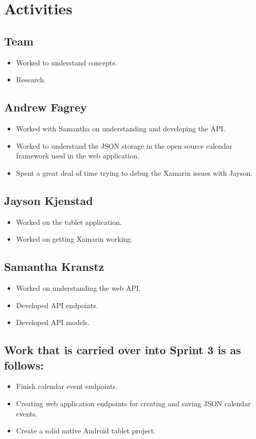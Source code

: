 \documentclass{article}
\begin{document}
{\section*{Activities}
\subsection*{Team}
\begin{itemize}
\item Worked to understand concepts.
\item Research.
\end{itemize}

\subsection*{Andrew Fagrey}
\begin{itemize}
\item Worked with Samantha on understanding and developing the API.
\item Worked to understand the JSON storage in the open source calendar framework used in the web application.
\item Spent a great deal of time trying to debug the Xamarin issues with Jayson.
\end{itemize}

\subsection*{Jayson Kjenstad}
\begin{itemize}
\item Worked on the tablet application.
\item Worked on getting Xamarin working.
\end{itemize}

\subsection*{Samantha Kranstz}
\begin{itemize}
\item Worked on understanding the web API.
\item Developed API endpoints.
\item Developed API models.
\end{itemize}


\subsection*{Work that is carried over into Sprint 3 is as follows:}
\begin{itemize}
\item Finish calendar event endpoints.
\item Creating web application endpoints for creating and saving JSON calendar events.
\item Create a solid native Android tablet project.
\end{itemize}

}
\end{document}
